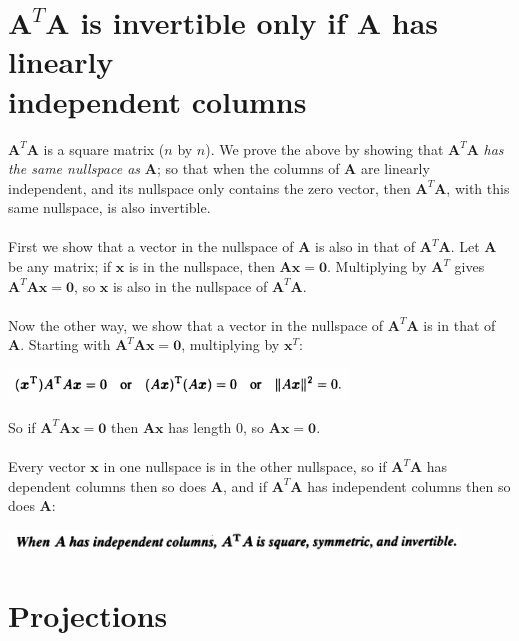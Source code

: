 \documentclass{report}
\begin{document}
\section{$\bm A^T\bm A$ is invertible only if $\bm A$ has linearly\\ independent columns}
$\bm A^T\bm A$ is a square matrix ($n$ by $n$). We prove the above by showing that $\bm A^T\bm A$ \textit{has the same nullspace as} $\bm A$; so that when the columns of 
$\bm A$ are linearly independent, and its nullspace only contains the zero vector, then $\bm A^T\bm A$, with this same nullspace, is also invertible.\\
\vspace{1mm}\\
First we show that a vector in the nullspace of $\bm A$ is also in that of $\bm A^T\bm A$. Let $\bm A$ be any matrix; if $\bm x$ is in the nullspace, then $\bm{Ax}=\bm0$.
Multiplying by $\bm A^T$ gives $\bm A^T\bm A\bm x=\bm0$, so $\bm x$ is also in the nullspace of $\bm A^T\bm A$.\\
\vspace{1mm}\\
Now the other way, we show that a vector in the nullspace of $\bm A^T\bm A$ is in that of $\bm A$. Starting with $\bm A^T\bm A\bm x=\bm 0$, multiplying by $\bm x^T$:
\begin{center}
\includegraphics[width=9cm]{60}
\end{center}
So if $\bm A^T\bm A\bm x=\bm 0$ then $\bm{Ax}$ has length 0, so $\bm{Ax}=\bm0$.\\
\vspace{1mm}\\
Every vector $\bm x$ in one nullspace is in the other nullspace, so if $\bm A^T\bm A$ has dependent columns then so does $\bm A$, and if $\bm A^T\bm A$ has independent 
columns then so does $\bm A$:
\begin{center}
\includegraphics[width=12cm]{61}
\end{center}
\newpage

\section{Projections}
\end{document}
